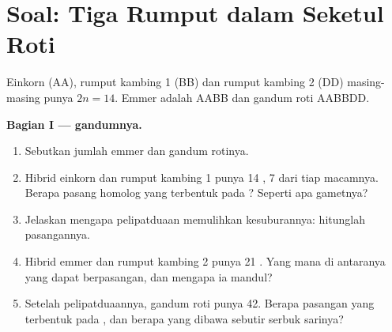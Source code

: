 \section{Soal: Tiga Rumput dalam Seketul Roti}

\begin{problem}
\label{pb:g12:diversification-of-life:1}
Einkorn (AA), rumput kambing 1 (BB) dan rumput kambing 2 (DD)
masing-masing punya $2n = 14$. Emmer adalah AABB dan gandum roti AABBDD.

\medskip
\noindent\textbf{Bagian I ---  gandumnya.}
\begin{enumerate}
  \item Sebutkan jumlah  emmer dan gandum rotinya.
  \item Hibrid einkorn dan rumput kambing 1 punya 14 , 7 dari
        tiap macamnya. Berapa pasang homolog yang terbentuk pada
        ? Seperti apa gametnya?
  \item Jelaskan mengapa pelipatduaan  memulihkan
        kesuburannya: hitunglah pasangannya.
  \item Hibrid emmer dan rumput kambing 2 punya 21 . Yang mana
        di antaranya yang dapat berpasangan, dan mengapa ia mandul?
  \item Setelah pelipatduaannya, gandum roti punya 42. Berapa pasangan
        yang terbentuk pada , dan berapa  yang dibawa
        sebutir serbuk sarinya?
\end{enumerate}


\end{problem}
